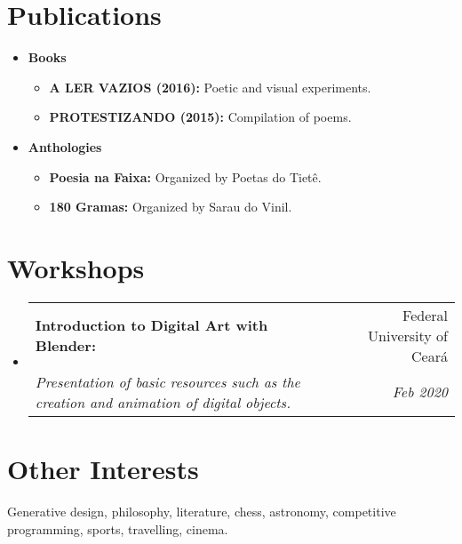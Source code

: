 \documentclass[letterpaper,11pt]{article}
\makeatletter
\newcommand{\resumeItem}[2]{
  \item\small{
    \textbf{#1}{ #2 \vspace{-2pt}}
  }
}
\newcommand{\resumeWorkshops}[4]{
  \vspace{-1pt}\item
    \begin{tabular*}{0.97\textwidth}{l@{\extracolsep{\fill}}r}
      \textbf{#1} & #2 \\
      \textit{\small#3} & \textit{\small #4} \\
    \end{tabular*}\vspace{-5pt}
    \vspace{0.3cm}
}
\newcommand{\resumeSubItem}[2]{\resumeItem{#1}{#2}\vspace{-4pt}}
\newcommand{\resumeSubHeadingListStart}{\begin{itemize}[leftmargin=*]}
\newcommand{\resumeSubHeadingListEnd}{\end{itemize}}
\makeatother
\begin{document}
\section{\faRocket \hspace{0.2cm} Publications}
  \resumeSubHeadingListStart
    \resumeSubItem{Books}{}
        \begin{itemize}
            \item \textbf{A LER VAZIOS (2016):} Poetic and visual experiments.
            \item \textbf{PROTESTIZANDO (2015):} Compilation of poems.
        \end{itemize}
    \resumeSubItem{Anthologies}{}
        \begin{itemize}
            \item \textbf{Poesia na Faixa:} Organized by Poetas do Tietê.
            \item \textbf{180 Gramas:} Organized by Sarau do Vinil.
        \end{itemize}
  \resumeSubHeadingListEnd

\section{\faUsers \hspace{0.2cm} Workshops}
    \resumeSubHeadingListStart
        \resumeWorkshops
            {Introduction to Digital Art with Blender:}{\faMapMarker \hspace{0.1cm} Federal University of Ceará}
            {Presentation of basic resources such as the creation and animation of digital objects.}{\faCalendar \hspace{0.1cm} Feb 2020}
    \resumeSubHeadingListEnd

\section{\faHeart \hspace{0.2cm} Other Interests}
    Generative design, philosophy, literature, chess, astronomy, competitive programming, sports, travelling, cinema.
  
\end{document}

